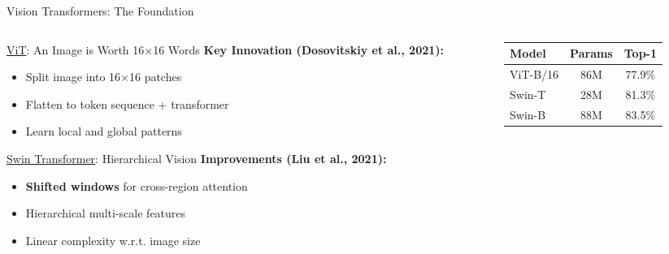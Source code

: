 \documentclass[aspectratio=169,xcolor=dvipsnames]{beamer}
\begin{document}
\begin{frame}{Vision Transformers: The Foundation}
    \begin{columns}
        \begin{column}{0.55\textwidth}
            \begin{block}{\href{https://arxiv.org/abs/2010.11929}{ViT}: An Image is Worth 16×16 Words}
                \small
                \textbf{Key Innovation (Dosovitskiy et al., 2021):}
                \begin{itemize}\setlength{\itemsep}{1pt}
                    \item Split image into 16×16 patches
                    \item Flatten to token sequence + transformer
                    \item Learn local and global patterns
                \end{itemize}
            \end{block}
            
            \vspace{0.2em}
            
            \begin{block}{\href{https://arxiv.org/abs/2103.14030}{Swin Transformer}: Hierarchical Vision}
                \small
                \textbf{Improvements (Liu et al., 2021):}
                \begin{itemize}\setlength{\itemsep}{1pt}
                    \item \textbf{Shifted windows} for cross-region attention
                    \item Hierarchical multi-scale features
                    \item Linear complexity w.r.t. image size
                \end{itemize}
            \end{block}
        \end{column}
        
        \begin{column}{0.42\textwidth}
            \begin{table}
                \centering
                \footnotesize
                \begin{tabular}{lcc}
                    \toprule
                    \textbf{Model} & \textbf{Params} & \textbf{Top-1} \\
                    \midrule
                    ViT-B/16 & 86M & 77.9\% \\
                    Swin-T & 28M & 81.3\% \\
                    Swin-B & 88M & 83.5\% \\
                    \bottomrule
                \end{tabular}
            \end{table}
            

\end{column}
\end{columns}
\end{frame}
\end{document}
